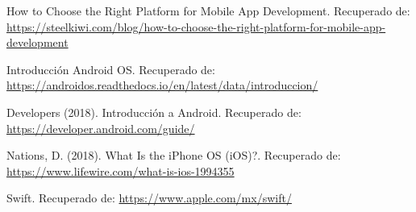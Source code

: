 \begin{thebibliography}{0}
	 How to Choose the Right Platform for Mobile App Development. Recuperado de: \url{https://steelkiwi.com/blog/how-to-choose-the-right-platform-for-mobile-app-development}
	
	 Introducción Android OS. Recuperado de: \url{https://androidos.readthedocs.io/en/latest/data/introduccion/}
	
	 Developers (2018). Introducción a Android. Recuperado de: \url{https://developer.android.com/guide/}
	
	 Nations, D. (2018). What Is the iPhone OS (iOS)?. Recuperado de: \url{https://www.lifewire.com/what-is-ios-1994355}
	
	 Swift. Recuperado de: \url{https://www.apple.com/mx/swift/}
	
	
	
\end{thebibliography}